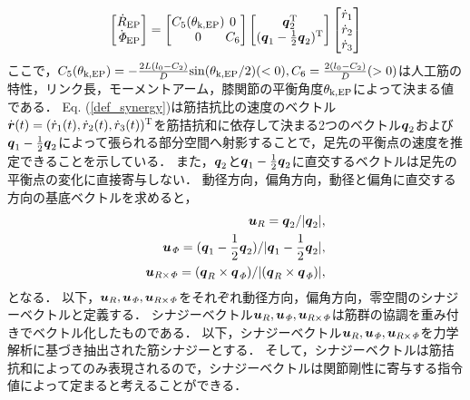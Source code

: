 \begin{eqnarray}
 \label{def_synergy}
 \arraycolsep=0.3pt
 \left[
  \begin{array}{c}
   \dot{R}_{\rm EP} \\
   \dot{\it \Phi}_{\rm EP}
  \end{array}
 \right]
 =
 \left[
  \begin{array}{cc}
   C_5(\theta_{\rm k,EP}) & 0 \\
   0 & C_6
  \end{array}
 \right]
 \left[
  \begin{array}{c}
   \ve{q}_2^{\rm T} \\
   (\ve{q}_1-\frac{1}{2}\ve{q}_2)^{\rm T}
  \end{array}
 \right]
 \left[
  \begin{array}{c}
   \dot{r}_{1} \\
   \dot{r}_{2} \\
   \dot{r}_{3}
  \end{array}
 \right]
\end{eqnarray}
ここで，$C_5(\theta_{\rm k,EP})=-\frac{2L(l_0-C_2)}{D}{\rm sin}(\theta_{\rm k,EP}/2)(<0),C_6=\frac{2(l_0-C_2)}{D}(>0)$は人工筋の特性，リンク長，モーメントアーム，膝関節の平衡角度$\theta_{\rm k,EP}$によって決まる値である．
Eq. (\ref{def_synergy})は筋拮抗比の速度のベクトル$\dot{\mbox{\boldmath $r$}}(t)=(\dot{r}_{1}(t),\dot{r}_{2}(t),\dot{r}_{3}(t))^{\rm T}$を筋拮抗和に依存して決まる2つのベクトル$\mbox{\boldmath $q$}_2$および$\mbox{\boldmath $q$}_1-\frac{1}{2}\mbox{\boldmath $q$}_2$によって張られる部分空間へ射影することで，足先の平衡点の速度を推定できることを示している．
また，$\mbox{\boldmath $q$}_2$と$\mbox{\boldmath $q$}_1-\frac{1}{2}\mbox{\boldmath $q$}_2$に直交するベクトルは足先の平衡点の変化に直接寄与しない．
動径方向，偏角方向，動径と偏角に直交する方向の基底ベクトルを求めると，
\begin{eqnarray}
 \mbox{\boldmath $u$}_R=\mbox{\boldmath $q$}_2/|\mbox{\boldmath $q$}_2|,\\
 \mbox{\boldmath $u$}_{\it \Phi}=(\mbox{\boldmath $q$}_1-\frac{1}{2}\mbox{\boldmath $q$}_2)/|\mbox{\boldmath $q$}_1-\frac{1}{2}\mbox{\boldmath $q$}_2|,\\
 \mbox{\boldmath $u$}_{R\times{\it \Phi}}=(\mbox{\boldmath $q$}_R\times\mbox{\boldmath $q$}_{\it \Phi})/|(\mbox{\boldmath $q$}_R\times\mbox{\boldmath $q$}_{\it \Phi})|,
\end{eqnarray}
となる．
以下，$\mbox{\boldmath $u$}_R,\mbox{\boldmath $u$}_{\it \Phi},\mbox{\boldmath $u$}_{R\times{\it \Phi}}$をそれぞれ動径方向，偏角方向，零空間のシナジーベクトルと定義する．
シナジーベクトル$\mbox{\boldmath $u$}_R,\mbox{\boldmath $u$}_{\it \Phi},\mbox{\boldmath $u$}_{R\times{\it \Phi}}$は筋群の協調を重み付きでベクトル化したものである．
以下，シナジーベクトル$\mbox{\boldmath $u$}_R,\mbox{\boldmath $u$}_{\it \Phi},\mbox{\boldmath $u$}_{R\times{\it \Phi}}$を力学解析に基づき抽出された筋シナジーとする．
そして，シナジーベクトルは筋拮抗和によってのみ表現されるので，シナジーベクトルは関節剛性に寄与する指令値によって定まると考えることができる．

